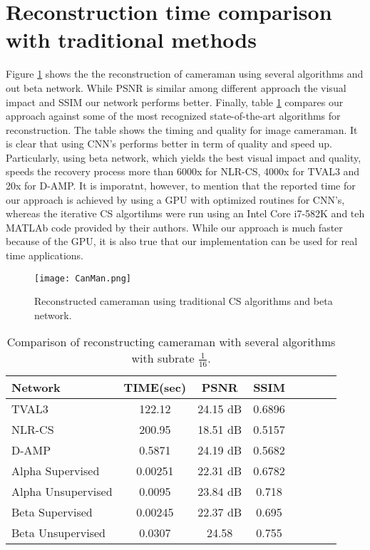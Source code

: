 \section{Reconstruction time comparison with traditional methods}
Figure \ref{fig:Canman1} shows the the reconstruction of cameraman using several algorithms and out beta network. While PSNR is similar among different approach the visual impact and SSIM our network performs better.
\newline \newline
Finally, table \ref{tab:summaryComp} compares our approach against some of the most recognized state-of-the-art algorithms for reconstruction. The table shows the timing and quality for image cameraman. It is clear that using CNN's performs better in term of quality and speed up. Particularly, using beta network, which yields the best visual impact and quality, speeds the recovery process more than 6000x for NLR-CS, 4000x for TVAL3 and 20x for D-AMP. It is imporatnt, however, to mention that the reported time for our approach is achieved by using a GPU with optimized routines for CNN's, whereas the iterative CS algortihms were run using an Intel Core i7-582K and teh MATLAb code provided by their authors. While our approach is much faster because of the GPU, it is also true that our implementation can be used for real time applications.  

\begin{figure}[!htb] 
\vspace{1.5cm}
\centering 
\texttt{[image: CanMan.png]}
\caption[Reconstructed cameraman with traditional methods]{Reconstructed cameraman using traditional CS algorithms and beta network.}
\label{fig:Canman1} 
\end{figure} 

\begin{table}[!htb]
\caption[Timing and quality metrics cameranman]{Comparison of reconstructing cameraman with several algorithms with subrate $\frac{1}{16}$.}
\label{tab:summaryComp}
\begin{center}
\begin{tabular}{l*{6}{c}r}
Network              & TIME(sec) & PSNR & SSIM \\
\hline
TVAL3 & 122.12 & 24.15 dB & 0.6896\\
NLR-CS & 200.95 & 18.51 dB & 0.5157\\
D-AMP & 0.5871 & 24.19 dB & 0.5682\\
Alpha Supervised   & 0.00251 & 22.31 dB & 0.6782\\
Alpha Unsupervised     & 0.0095 & 23.84 dB & 0.718\\
Beta Supervised & 0.00245 & 22.37 dB & 0.695 \\
Beta Unsupervised & 0.0307 & 24.58 & 0.755\\
\bottomrule 
\end{tabular}%
\end{center}  
\end{table}
\FloatBarrier

